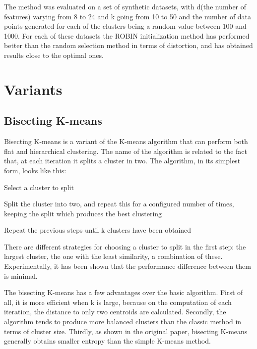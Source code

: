 \documentclass[12pt]{article}
\begin{document}
	The method was evaluated on a set of synthetic datasets, with d(the number of features) varying from 8 to 24 and k going from 10 to 50 and the number of data points generated for each of the clusters being a random value between 100 and 1000. For each of these datasets the ROBIN initialization method has performed better than the random selection method in terms of distortion, and has obtained results close to the optimal ones.
	
	\section{Variants}
	\subsection{Bisecting K-means} 
	Bisecting K-means\cite{BisectingKmeans} is a variant of the K-means algorithm that can perform both flat and hierarchical clustering. The name of the algorithm is related to the fact that, at each iteration it splits a cluster in two. The algorithm, in its simplest form, looks like this:
	\begin{compactenum}
		\item Select a cluster to split
		\item Split the cluster into two, and repeat this for a configured number of times, keeping the split which produces the best clustering
		\item Repeat the previous steps until k clusters have been obtained
	\end{compactenum}
	
	There are different strategies for choosing a cluster to split in the first step: the largest cluster, the one with the least similarity, a combination of these. Experimentally, it has been shown that the performance difference between them is minimal.
	
	The bisecting K-means has a few advantages over the basic algorithm. First of all, it is more efficient when k is large, because on the computation of each iteration, the distance to only two centroids are calculated. Secondly, the algorithm tends to produce more balanced clusters than the classic method in terms of cluster size. Thirdly, as shown in the original paper\cite{BisectingKmeans}, bisecting K-means generally obtains smaller entropy than the simple K-means method. 
	
\end{document}
